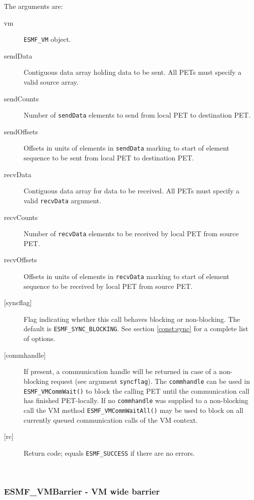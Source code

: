      The arguments are:
     \begin{description}
     \item[vm] 
          {\tt ESMF\_VM} object.
     \item[sendData]
          Contiguous data array holding data to be sent. All PETs must specify a
          valid source array.
     \item[sendCounts] 
          Number of {\tt sendData} elements to send from local PET to
          destination PET.
     \item[sendOffsets] 
          Offsets in units of elements in {\tt sendData} marking to start of
          element sequence to be sent from local PET to destination PET.
     \item[recvData] 
          Contiguous data array for data to be received. All PETs must specify a
          valid {\tt recvData} argument.
     \item[recvCounts] 
          Number of {\tt recvData} elements to be received by local PET from
          source PET.
     \item[recvOffsets] 
          Offsets in units of elements in {\tt recvData} marking to start of
          element sequence to be received by local PET from source PET.
     \item[{[syncflag]}]
          Flag indicating whether this call behaves blocking or non-blocking.
          The default is {\tt ESMF\_SYNC\_BLOCKING}. See section
          \ref{const:sync} for a complete list of options.
     \item[{[commhandle]}]
          If present, a communication handle will be returned in case of a 
          non-blocking request (see argument {\tt syncflag}). The
          {\tt commhandle} can be used in {\tt ESMF\_VMCommWait()} to block the
          calling PET until the communication call has finished PET-locally. If
          no {\tt commhandle} was supplied to a non-blocking call the VM method
          {\tt ESMF\_VMCommWaitAll()} may be used to block on all currently queued
          communication calls of the VM context.
     \item[{[rc]}] 
          Return code; equals {\tt ESMF\_SUCCESS} if there are no errors.
     \end{description}
   
 
\mbox{}\hrulefill\ 
 
\subsubsection [ESMF\_VMBarrier] {ESMF\_VMBarrier - VM wide barrier}


